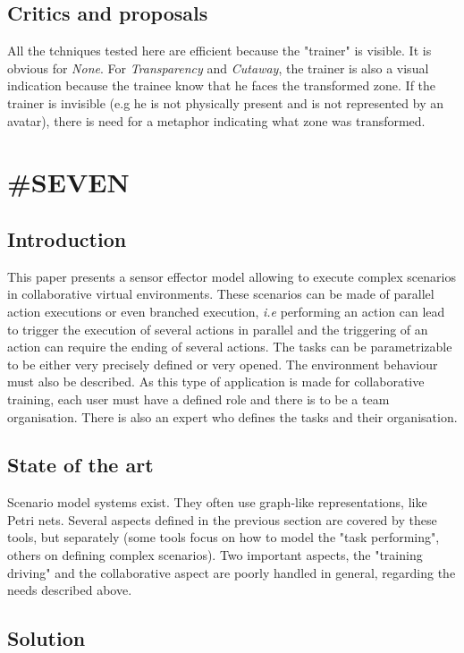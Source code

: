 \documentclass[a4paper]{article}
\begin{document}
\subsection{Critics and proposals}
All the tchniques tested here are efficient because the "trainer" is visible. It is obvious for \textit{None}. For \textit{Transparency} and \textit{Cutaway}, the trainer is also a visual indication because the trainee know that he faces the transformed zone. If the trainer is invisible (e.g he is not physically present and is not represented by an avatar), there is need for a metaphor indicating what zone was transformed.

\section{\#SEVEN}

\subsection{Introduction}

This paper presents a sensor effector model allowing to execute complex scenarios in collaborative virtual environments. These scenarios can be made of parallel action executions or even branched execution, \textit{i.e} performing an action can lead to trigger the execution of several actions in parallel and the triggering of an action can require the ending of several actions. The tasks can be parametrizable to be either very precisely defined or very opened. The environment behaviour must also be described. As this type of application is made for collaborative training, each user must have a defined role and there is to be a team organisation. There is also an expert who defines the tasks and their organisation.

\subsection{State of the art}

Scenario model systems exist. They often use graph-like representations, like Petri nets. Several aspects defined in the previous section are covered by these tools, but separately (some tools focus on how to model the "task performing", others on defining complex scenarios). Two important aspects, the "training driving" and the collaborative aspect are poorly handled in general, regarding the needs described above.

\subsection{Solution}
\end{document}
